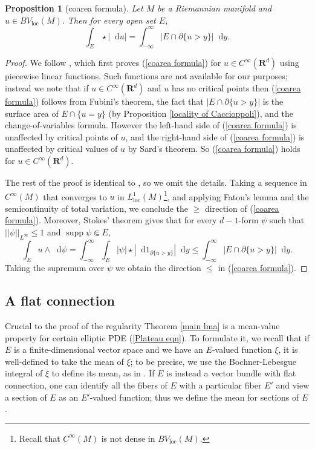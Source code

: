 \documentclass[reqno,10pt]{amsart}
\newcommand{\RR}{\mathbf{R}}
\DeclareMathOperator{\supp}{supp}
\newcommand*\dif{\mathop{}\!\mathrm{d}}
\newcommand{\loc}{\mathrm{loc}}
\newtheorem{proposition}[theorem]{Proposition}
\theoremstyle{definition}
\numberwithin{equation}{section}
\begin{document}
\begin{proposition}[coarea formula]\label{Coarea2}
Let $M$ be a Riemannian manifold and $u \in BV_\loc(M)$. Then for every open set $E$,
\begin{equation}\label{coarea formula}
\int_E \star |\dif u| = \int_{-\infty}^\infty |E \cap \partial \{u > y\}| \dif y.
\end{equation}
\end{proposition}
\begin{proof}
We follow \cite[Theorem 1.23]{Giusti77}, which first proves (\ref{coarea formula}) for $u \in C^\infty(\RR^d)$ using piecewise linear functions.
Such functions are not available for our purposes; instead we note that if $u \in C^\infty(\RR^d)$ and $u$ has no critical points then (\ref{coarea formula}) follows from Fubini's theorem, the fact that $|E \cap \partial \{u > y\}|$ is the surface area of $E \cap \{u = y\}$ (by Proposition \ref{locality of Caccioppoli}), and the change-of-variables formula.
However the left-hand side of (\ref{coarea formula}) is unaffected by critical points of $u$, and the right-hand side of (\ref{coarea formula}) is unaffected by critical values of $u$ by Sard's theorem.
So (\ref{coarea formula}) holds for $u \in C^\infty(\RR^d)$.

The rest of the proof is identical to \cite[Theorem 1.23]{Giusti77}, so we omit the details.
Taking a sequence in $C^\infty(M)$ that converges to $u$ in $L^1_\loc(M)$\footnote{Recall that $C^\infty(M)$ is not dense in $BV_\loc(M)$.}, and applying Fatou's lemma and the semicontinuity of total variation, we conclude the $\geq$ direction of (\ref{coarea formula}).
Moreover, Stokes' theorem gives that for every $d-1$-form $\psi$ such that $||\psi||_{L^\infty} \leq 1$ and $\supp \psi \Subset E$,
$$\int_E u \wedge \dif \psi = \int_{-\infty}^\infty \int_E |\psi| \star |\dif 1_{\partial \{u > y\}}| \dif y \leq \int_{-\infty}^\infty |E \cap \partial \{u > y\}| \dif y.$$
Taking the supremum over $\psi$ we obtain the direction $\leq$ in (\ref{coarea formula}).
\end{proof}

\subsection{A flat connection}
Crucial to the proof of the regularity Theorem \ref{main lma} is a mean-value property for certain elliptic PDE (\ref{Plateau eqn}).
To formulate it, we recall that if $E$ is a finite-dimensional vector space and we have an $E$-valued function $\xi$, it is well-defined to take the mean of $\xi$; to be precise, we use the Bochner-Lebesgue integral of $\xi$ to define its mean, as in \cite{Rieffel70}.
If $E$ is instead a vector bundle with flat connection, one can identify all the fibers of $E$ with a particular fiber $E'$ and view a section of $E$ as an $E'$-valued function; thus we define the mean for sections of $E$.
\end{document}
